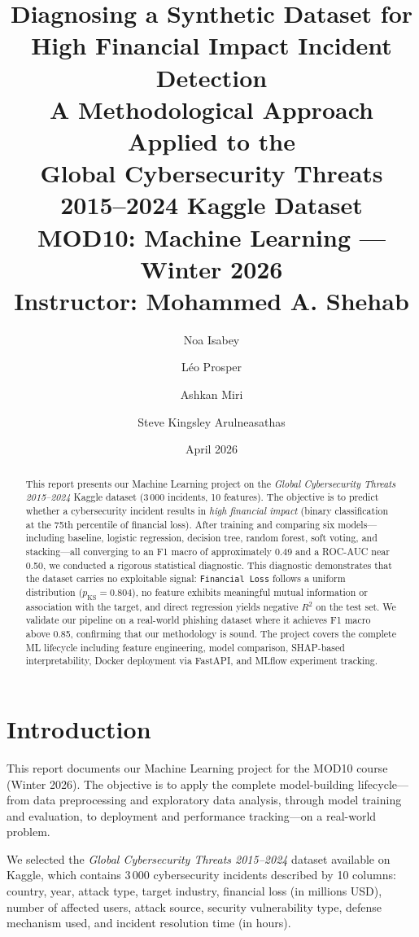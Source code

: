 \documentclass[a4paper,12pt]{article}
\title{
\textbf{Diagnosing a Synthetic Dataset for High Financial Impact Incident Detection}\\[6pt]
\large A Methodological Approach Applied to the\\
Global Cybersecurity Threats 2015--2024 Kaggle Dataset\\[12pt]
\normalsize MOD10: Machine Learning --- Winter 2026\\
Instructor: Mohammed A. Shehab
}
\author{
Noa Isabey \and
L\'eo Prosper \and
Ashkan Miri \and
Steve Kingsley Arulneasathas
}
\date{April 2026}
\begin{document}
\maketitle
\thispagestyle{empty}

\begin{abstract}
This report presents our Machine Learning project on the \emph{Global Cybersecurity Threats 2015--2024} Kaggle dataset (3\,000 incidents, 10 features). The objective is to predict whether a cybersecurity incident results in \emph{high financial impact} (binary classification at the 75th percentile of financial loss). After training and comparing six models---including baseline, logistic regression, decision tree, random forest, soft voting, and stacking---all converging to an F1 macro of approximately 0.49 and a ROC-AUC near 0.50, we conducted a rigorous statistical diagnostic. This diagnostic demonstrates that the dataset carries no exploitable signal: \texttt{Financial Loss} follows a uniform distribution ($p_\text{KS} = 0.804$), no feature exhibits meaningful mutual information or association with the target, and direct regression yields negative $R^2$ on the test set. We validate our pipeline on a real-world phishing dataset where it achieves F1 macro above 0.85, confirming that our methodology is sound. The project covers the complete ML lifecycle including feature engineering, model comparison, SHAP-based interpretability, Docker deployment via FastAPI, and MLflow experiment tracking.
\end{abstract}

\tableofcontents
\newpage

\section{Introduction}
\label{sec:intro}

This report documents our Machine Learning project for the MOD10 course (Winter 2026). The objective is to apply the complete model-building lifecycle---from data preprocessing and exploratory data analysis, through model training and evaluation, to deployment and performance tracking---on a real-world problem.

We selected the \emph{Global Cybersecurity Threats 2015--2024} dataset available on Kaggle, which contains 3\,000 cybersecurity incidents described by 10 columns: country, year, attack type, target industry, financial loss (in millions USD), number of affected users, attack source, security vulnerability type, defense mechanism used, and incident resolution time (in hours).
\end{document}
